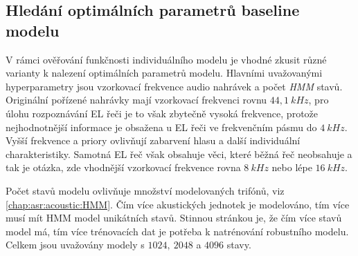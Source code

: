 
\subsection{Hledání optimálních parametrů baseline modelu}
\label{chap:construction:results:baseline}


V rámci ověřování funkčnosti individuálního modelu je vhodné zkusit různé varianty k nalezení optimálních parametrů modelu. Hlavními uvažovanými hyperparametry jsou vzorkovací frekvence audio nahrávek a počet \textit{HMM} stavů. Originální pořízené nahrávky mají vzorkovací frekvenci rovnu $44,1\ kHz$, pro úlohu rozpoznávání EL řeči je to však zbytečně vysoká frekvence, protože nejhodnotnější informace je obsažena u EL řeči ve frekvenčním pásmu do $4\ kHz$. Vyšší frekvence a priory ovlivňují zabarvení hlasu a další individuální charakteristiky. \cite{Psutka2006} Samotná EL řeč však obsahuje věci, které běžná řeč neobsahuje a tak je otázka, zde vhodnější vzorkovací frekvence rovna $8\ kHz$ nebo lépe $16\ kHz$.

Počet stavů modelu ovlivňuje množství modelovaných trifónů, viz \ref{chap:asr:acoustic:HMM}. Čím více akustických jednotek je modelováno, tím více musí mít HMM model unikátních stavů. Stinnou stránkou je, že čím více stavů model má, tím více trénovacích dat je potřeba k natrénování robustního modelu. Celkem jsou uvažovány modely s $1024,\ 2048$ a $4096$ stavy.


